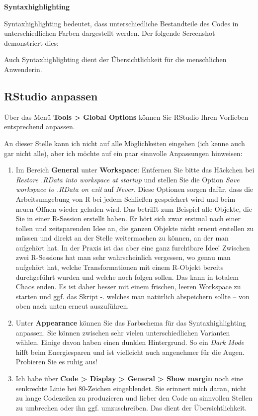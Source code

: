 \documentclass[
]{book}
\begin{document}
\textbf{Syntaxhighlighting}

Syntaxhighlighting bedeutet, dass unterschiedliche Bestandteile des Codes in unterschiedlichen Farben dargestellt werden. Der folgende Screenshot demonstriert dies:

Auch Syntaxhighlighting dient der Übersichtlichkeit für die menschlichen Anwenderin.

\hypertarget{rstudio-anpassen}{%
\subsection{RStudio anpassen}\label{rstudio-anpassen}}

Über das Menü \textbf{Tools \textgreater{} Global Options} können Sie RStudio Ihren Vorlieben entsprechend anpassen.

An dieser Stelle kann ich nicht auf alle Möglichkeiten eingehen (ich kenne auch gar nicht alle), aber ich möchte auf ein paar sinnvolle Anpassungen hinweisen:

\begin{enumerate}
\def\labelenumi{\arabic{enumi}.}
\item
  Im Bereich \textbf{General} unter \textbf{Workspace}: Entfernen Sie bitte das Häckchen bei \emph{Restore .RData into workspace at startup} und stellen Sie die Option \emph{Save workspace to .RData on exit} auf \emph{Never}. Diese Optionen sorgen dafür, dass die Arbeitsumgebung von R bei jedem Schließen gespeichert wird und beim neuen Öffnen wieder geladen wird. Das betrifft zum Beispiel alle Objekte, die Sie in einer R-Session erstellt haben. Er hört sich zwar erstmal nach einer tollen und zeitsparenden Idee an, die ganzen Objekte nicht erneut erstellen zu müssen und direkt an der Stelle weitermachen zu können, an der man aufgehört hat. In der Praxis ist das aber eine ganz furchtbare Idee! Zwischen zwei R-Sessions hat man sehr wahrscheinlich vergessen, wo genau man aufgehört hat, welche Transformationen mit einem R-Objekt bereits durchgeführt wurden und welche noch folgen sollen. Das kann in totalem Chaos enden. Es ist daher besser mit einem frischen, leeren Workspace zu starten und ggf. das Skript -. welches man natürlich abspeichern sollte -- von oben nach unten erneut auszuführen.
\item
  Unter \textbf{Appearance} können Sie das Farbschema für das Syntaxhighlighting anpassen. Sie können zwischen sehr vielen unterschiedlichen Varianten wählen. Einige davon haben einen dunklen Hintergrund. So ein \emph{Dark Mode} hilft beim Energiesparen und ist vielleicht auch angenehmer für die Augen. Probieren Sie es ruhig aus!
\item
  Ich habe über \textbf{Code \textgreater{} Display \textgreater{} General \textgreater{} Show margin} noch eine senkrechte Linie bei 80-Zeichen eingeblendet. Sie erinnert mich daran, nicht zu lange Codezeilen zu produzieren und lieber den Code an sinnvollen Stellen zu umbrechen oder ihn ggf. umzuschreiben. Das dient der Übersichtlichkeit.
\end{enumerate}
\end{document}
